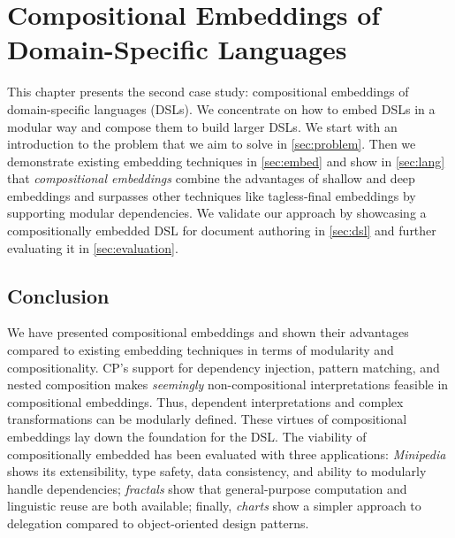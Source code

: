 \chapter{Compositional Embeddings of Domain-Specific Languages} \label{ch:embedding}

This chapter presents the second case study: compositional embeddings of
domain-specific languages (DSLs). We concentrate on how to embed DSLs in a
modular way and compose them to build larger DSLs. We start with an introduction
to the problem that we aim to solve in \autoref{sec:problem}. Then we
demonstrate existing embedding techniques in \autoref{sec:embed} and show in
\autoref{sec:lang} that \emph{compositional embeddings} combine the advantages
of shallow and deep embeddings and surpasses other techniques like tagless-final
embeddings by supporting modular dependencies. We validate our approach by
showcasing a compositionally embedded DSL for document authoring in
\autoref{sec:dsl} and further evaluating it in \autoref{sec:evaluation}.







\section{Conclusion}

We have presented compositional embeddings and shown their advantages compared
to existing embedding techniques in terms of modularity and compositionality.
CP's support for dependency injection, pattern matching, and nested composition
makes \emph{seemingly} non-compositional interpretations feasible in
compositional embeddings. Thus, dependent interpretations and complex
transformations can be modularly defined. These virtues of compositional
embeddings lay down the foundation for the \ExT DSL. The viability of
compositionally embedded \ExT has been evaluated with three applications:
\emph{Minipedia} shows its extensibility, type safety, data consistency, and
ability to modularly handle dependencies; \emph{fractals} show that
general-purpose computation and linguistic reuse are both available; finally,
\emph{charts} show a simpler approach to delegation compared to object-oriented
design patterns.
